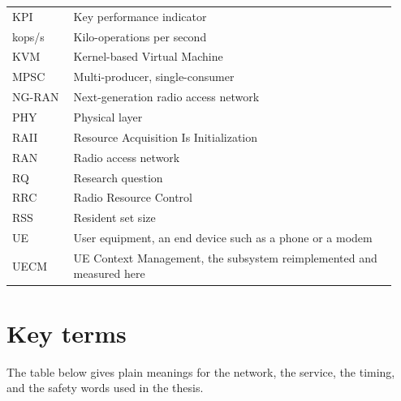 \documentclass[english,oneside,a4paper,censored,csm,software-track-2020]{HYthesisML}
\begin{document}
\begin{longtable}{@{}p{0.15\linewidth} p{0.79\linewidth}@{}}
KPI & Key performance indicator \\
kops/s & Kilo-operations per second \\
KVM & Kernel-based Virtual Machine \\
MPSC & Multi-producer, single-consumer \\
NG-RAN & Next-generation radio access network \\
PHY & Physical layer \\
RAII & Resource Acquisition Is Initialization \\
RAN & Radio access network \\
RQ & Research question \\
RRC & Radio Resource Control \\
RSS & Resident set size \\
UE & User equipment, an end device such as a phone or a modem \\
UECM & UE Context Management, the subsystem reimplemented and measured here \\
\hline
\end{longtable}
\endgroup

\cleardoublepage
{}
{}
\chapter*{Key terms}
\label{appendix:terms}

\noindent The table below gives plain meanings for the network, the service, the timing, and the safety
words used in the thesis.     
\end{document}

